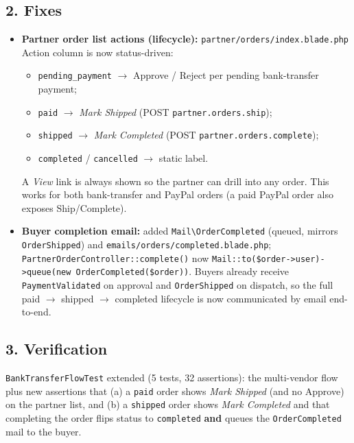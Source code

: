 \documentclass[12pt,a4paper]{article}
\begin{document}
\subsection{2. Fixes}

\begin{itemize}
    \item \textbf{Partner order list actions (lifecycle):} \texttt{partner/orders/index.blade.php} Action
    column is now status-driven:
    \begin{itemize}
        \item \texttt{pending\_payment} $\rightarrow$ Approve / Reject per pending bank-transfer payment;
        \item \texttt{paid} $\rightarrow$ \emph{Mark Shipped} (POST \texttt{partner.orders.ship});
        \item \texttt{shipped} $\rightarrow$ \emph{Mark Completed} (POST \texttt{partner.orders.complete});
        \item \texttt{completed} / \texttt{cancelled} $\rightarrow$ static label.
    \end{itemize}
    A \emph{View} link is always shown so the partner can drill into any order. This works for both
    bank-transfer and PayPal orders (a paid PayPal order also exposes Ship/Complete).
    \item \textbf{Buyer completion email:} added \texttt{Mail\textbackslash OrderCompleted} (queued, mirrors
    \texttt{OrderShipped}) and \texttt{emails/orders/completed.blade.php}; \texttt{PartnerOrderController::complete()}
    now \texttt{Mail::to(\$order->user)->queue(new OrderCompleted(\$order))}. Buyers already receive
    \texttt{PaymentValidated} on approval and \texttt{OrderShipped} on dispatch, so the full
    paid $\rightarrow$ shipped $\rightarrow$ completed lifecycle is now communicated by email end-to-end.
\end{itemize}

\subsection{3. Verification}

\texttt{BankTransferFlowTest} extended (5 tests, 32 assertions): the multi-vendor flow plus new assertions
that (a) a \texttt{paid} order shows \emph{Mark Shipped} (and no Approve) on the partner list, and
(b) a \texttt{shipped} order shows \emph{Mark Completed} and that completing the order flips status to
\texttt{completed} \textbf{and} queues the \texttt{OrderCompleted} mail to the buyer.
\end{document}
